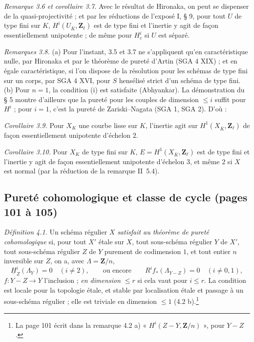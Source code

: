 \documentclass[11pt,a4paper]{article}
\begin{document}
\emph{Remarque 3.6 et corollaire 3.7.} Avec le résultat de Hironaka, on peut se
dispenser de la quasi-projectivité ; et par les réductions de l'exposé I, § 9,
pour tout $U$ de type fini sur $K$, $H^i(U_{\overline K}, \mathbf{Z}_\ell)$ est
de type fini et l'inertie y agit de façon essentiellement unipotente ; de même
pour $H^i_c$ si $U$ est séparé.

\emph{Remarques 3.8.} (a) Pour l'instant, 3.5 et 3.7 ne s'appliquent qu'en
caractéristique nulle, par Hironaka et par le théorème de pureté d'Artin
(SGA 4 XIX) ; et en égale caractéristique, si l'on dispose de la résolution pour
les schémas de type fini sur un corps, par SGA 4 XVI, pour $S$ hensélisé strict
d'un schéma de type fini. (b) Pour $n = 1$, la condition (i) est satisfaite
(Abhyankar). La démonstration du § 5 montre d'ailleurs que la pureté pour les
couples de dimension $\leq i$ suffit pour $H^i$ ; pour $i = 1$, c'est la pureté
de Zariski--Nagata (SGA 1, SGA 2). D'où :

\emph{Corollaire 3.9.} Pour $X_K$ une courbe lisse sur $K$, l'inertie agit sur
$H^1(X_{\overline K}, \mathbf{Z}_\ell)$ de façon essentiellement unipotente
d'échelon $2$.

\emph{Corollaire 3.10.} Pour $X_K$ de type fini sur $K$, $E = H^1(X_{\overline K},
\mathbf{Z}_\ell)$ est de type fini et l'inertie y agit de façon essentiellement
unipotente d'échelon $3$, et même $2$ si $X$ est normal (par la réduction de la
remarque II~5.4).

\subsection*{Pureté cohomologique et classe de cycle (pages 101 à 105)}

\emph{Définition 4.1.} Un schéma régulier $X$ \emph{satisfait au théorème de
pureté cohomologique} si, pour tout $X'$ étale sur $X$, tout sous-schéma régulier
$Y$ de $X'$, tout sous-schéma régulier $Z$ de $Y$ purement de codimension $1$, et
tout entier $n$ inversible sur $Z$, on a, avec $\Lambda = \mathbf{Z}/n$,
\[
  \underline H^i_Z(\Lambda_Y) = 0 \quad (i \neq 2) ,
  \qquad\text{ou encore}\qquad
  R^i f_*(\Lambda_{Y - Z}) = 0 \quad (i \neq 0, 1),
\]
$f : Y - Z \to Y$ l'inclusion ; \emph{en dimension $\leq r$} si cela vaut pour
$i \leq r$. La condition est locale pour la topologie étale, et stable par
localisation étale et passage à un sous-schéma régulier ; elle est triviale en
dimension $\leq 1$ (4.2 b).\footnote{La page 101 écrit dans la remarque 4.2 a)
« $H^i(Z - Y, \mathbf{Z}/n)$ », pour $Y - Z$.}
\end{document}
